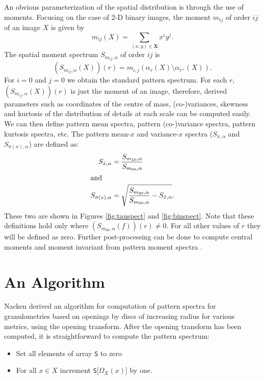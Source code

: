 \documentclass{sciposter}
\begin{document}
\begin{multicols}{3}
An obvious parameterization of the spatial distribution is through 
the use of moments. Focusing on the case of 2-D binary images, the 
moment $m_{ij}$ of order $ij$ of an image $X$ is given by
\begin{equation}
  m_{ij}(X) = \sum_{(x,y) \in \mathbf X} x^i y^j.
\end{equation}  
The spatial moment spectrum $S_{m_{ij},\alpha}$ of order $ij$ is
\begin{equation}
  (S_{m_{ij},\alpha}(X))(r) = m_{i,j}(\alpha_r(X) \setminus \alpha_{r^+}(X)).
\end{equation}  
For $i=0$ and $j=0$ we obtain the standard pattern spectrum. 
For each $r$, $(S_{m_{ij},\alpha}(X))(r)$ is just the moment of an image, 
therefore, derived parameters such as coordinates of the centre of mass, 
(co-)variances, skewness and kurtosis of the distribution of details at each
scale can be computed easily. We can then define pattern mean
spectra, pattern (co-)variance spectra, pattern kurtosis spectra, etc. The 
pattern mean-$x$ and variance-$x$ spectra 
($S_{\bar x,\alpha}$ and $S_{\sigma(x),\alpha}$) are defined as: 
\begin{align}
  S_{\bar x,\alpha} & = \frac{S_{m_{10},\alpha}} {S_{m_{00},\alpha}} \\
\intertext{and}
   S_{\sigma(x),\alpha} & = \sqrt{\frac{S_{m_{20},\alpha}}
                                 {S_{m_{00},\alpha}} 
                                 - S_{\bar x, \alpha}}.  
 \end{align}
These two are shown in Figures \ref{fig:tauspect} and \ref{fig:binspect}. Note that 
these definitions hold only where $(S_{m_{00},\alpha}(f))(r) \neq 0$. For all 
other values of $r$ they will be defined as zero. Further post-processing can
be done to compute central moments and moment invariant from pattern moment 
spectra \cite{Flusser:Suk:93,Hu:62}. 

\section{An Algorithm}

Nacken \cite{Nacken:thesis} derived an algorithm for computation
of pattern spectra for granulometries based on openings by discs of increasing
radius for various metrics, using the opening transform. After the
opening transform has been computed, it is straightforward to compute the 
pattern spectrum:
\begin{itemize}
\item Set all elements of array {\tt S} to zero
\item For all $x \in X$ increment {\tt S}[$\Omega_X(x)$] by one. 
\end{itemize}


\end{multicols}
\end{document}
